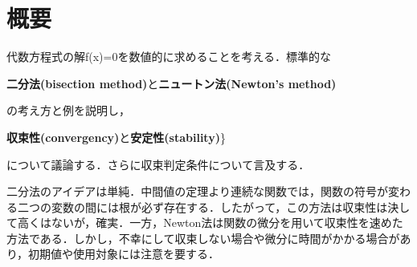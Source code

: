 \documentclass{article}
\begin{document}
\section{\textbf{概要}}
\begin{maplegroup}
\begin{Maple Normal}{
代数方程式の解f(x)=0を数値的に求めることを考える．標準的な}\end{Maple Normal}

\begin{center}
\begin{Maple Normal}{
\textbf{二分法(bisection method)}と\textbf{ニュートン法(Newton's method)}}\end{Maple Normal}
\end{center}
\begin{Maple Normal}{
の考え方と例を説明し，}\end{Maple Normal}

\begin{center}
\begin{Maple Normal}{
\textbf{収束性(convergency)}と\textbf{安定性(stability)}\}}\end{Maple Normal}
\end{center}
\begin{Maple Normal}{
について議論する．さらに収束判定条件について言及する．}\end{Maple Normal}
\end{maplegroup}
\begin{maplegroup}
\begin{Maple Normal}{
二分法のアイデアは単純．中間値の定理より連続な関数では，関数の符号が変わる二つの変数の間には根が必ず存在する．したがって，この方法は収束性は決して高くはないが，確実．一方，Newton法は関数の微分を用いて収束性を速めた方法である．しかし，不幸にして収束しない場合や微分に時間がかかる場合があり，初期値や使用対象には注意を要する．}\end{Maple Normal}

\end{maplegroup}
\end{document}
